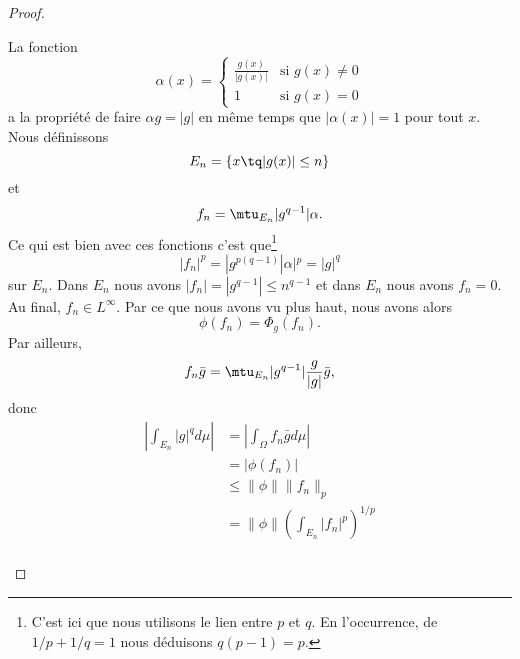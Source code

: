 \begin{proof}
\begin{subproof}
		La fonction
		\begin{equation}
			\alpha(x)=\begin{cases}
				\frac{ g(x) }{ | g(x) | } & \text{si } g(x)\neq 0 \\
				1                         & \text{si } g(x)=0
			\end{cases}
		\end{equation}
		a la propriété de faire \( \alpha g=| g |\) en même temps que \( | \alpha(x) |=1\) pour tout \( x\). Nous définissons
		\begin{equation}
			E_n=\{ x\tq | g(x) |\leq n \}
		\end{equation}
		et
		\begin{equation}
			f_n=\mtu_{E_n}| g^{q-1} |\alpha.
		\end{equation}
		Ce qui est bien avec ces fonctions c'est que\footnote{C'est ici que nous utilisons le lien entre \( p\) et \( q\). En l'occurrence, de \( 1/p+1/q=1\) nous déduisons \( q(p-1)=p\).}
		\begin{equation}
			| f_n |^p=| g^{p(q-1)} | \alpha |^p=| g |^q
		\end{equation}
		sur \( E_n\). Dans \( E_n\) nous avons \( | f_n |=| g^{q-1} |\leq n^{q-1}\) et dans \( E_n\) nous avons \( f_n=0\). Au final, \( f_n\in L^{\infty}\). Par ce que nous avons vu plus haut, nous avons alors
		\begin{equation}
			\phi(f_n)=\Phi_g(f_n).
		\end{equation}
		Par ailleurs,
		\begin{equation}
			f_n\bar g=\mtu_{E_n}| g^{q-1} |\frac{ g }{ | g | }\bar g,
		\end{equation}
		donc
		\begin{subequations}
			\begin{align}
				\left|\int_{E_n}| g |^qd\mu\right| & =|\int_{\Omega}f_n\bar gd\mu|                       \\
				                                   & =|\phi(f_n)|                                        \\
				                                   & \leq \| \phi \|\| f_n \|_p                          \\
				                                   & =\| \phi \|\left( \int_{E_n}| f_n |^p \right)^{1/p} \\

\end{align}
\end{subequations}
\end{subproof}
\end{proof}

